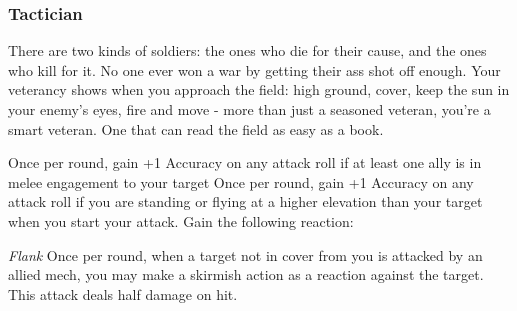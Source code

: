 \subsubsection{Tactician}

\begin{talent}
{There are two kinds of soldiers: the ones who die for their cause, and the ones who kill for it. No one ever won a war by getting their ass shot off enough. Your veterancy shows when you approach the field: high ground, cover, keep the sun in your enemy’s eyes, fire and move - more than just a seasoned veteran, you’re a smart veteran. One that can read the field as easy as a book.} 

Once per round, gain +1 Accuracy on any attack roll if at least one ally is in melee engagement to your target 
Once per round, gain +1 Accuracy on any attack roll if you are standing or flying at a higher elevation than your target when you start your attack. 
Gain the following reaction:

\textit{Flank}\newline
\Reaction\newline
Once per round, when a target not in cover from you is attacked by an allied mech, you may make a skirmish action as a reaction against the target. This attack deals half damage on hit.
\end{talent}